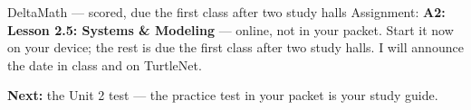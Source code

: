 \documentclass[aspectratio=169, 11pt]{beamer}
\begin{document}
\begin{frame}[t, plain]
  \begin{block}{DeltaMath --- scored, due the first class after two study halls}
    Assignment: \textbf{A2: Lesson 2.5: Systems \& Modeling} --- online, not in your packet. Start it now on
    your device; the rest is due the first class after two study halls. I will announce the date
    in class and on TurtleNet.
  \end{block}
  \vspace{6pt}
  \textbf{Next:} the Unit 2 test --- the practice test in your packet is your study guide.
\end{frame}
\end{document}
